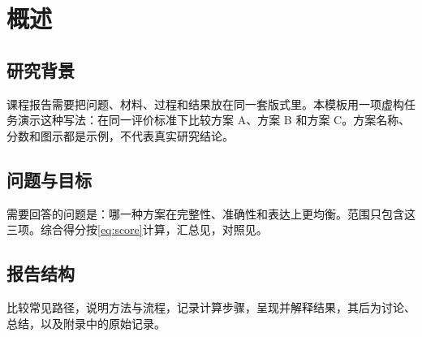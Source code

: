 \section{概述}
\label{sec:intro}

\subsection{研究背景}
课程报告需要把问题、材料、过程和结果放在同一套版式里。本模板用一项虚构任务演示这种写法：在同一评价标准下比较方案 A、方案 B 和方案 C。方案名称、分数和图示都是示例，不代表真实研究结论。

\subsection{问题与目标}
需要回答的问题是：哪一种方案在完整性、准确性和表达上更均衡。范围只包含这三项。综合得分按\eqref{eq:score}计算，汇总见，对照见。

\subsection{报告结构}
比较常见路径，说明方法与流程，记录计算步骤，呈现并解释结果，其后为讨论、总结，以及附录中的原始记录。
